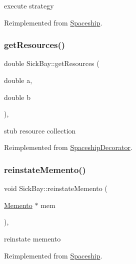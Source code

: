 execute strategy 

Reimplemented from \hyperlink{classSpaceship}{Spaceship}.

\mbox{\label{classSickBay_ab14fde02df1e95c352ba51d59480c3fa}} 
\subsubsection{\texorpdfstring{get\+Resources()}{getResources()}}
{\footnotesize\ttfamily double Sick\+Bay\+::get\+Resources (\begin{DoxyParamCaption}\item[{double}]{a,  }\item[{double}]{b }\end{DoxyParamCaption})\hspace{0.3cm}{\ttfamily [inline]}, {\ttfamily [virtual]}}

stub resource collection 

Reimplemented from \hyperlink{classSpaceshipDecorator_a5ee7a9a8c146c85f08591e47d971dce7}{Spaceship\+Decorator}.

\mbox{\label{classSickBay_a1b2156dee5ed14c68c3f25ee3a53e9c8}} 
\subsubsection{\texorpdfstring{reinstate\+Memento()}{reinstateMemento()}}
{\footnotesize\ttfamily void Sick\+Bay\+::reinstate\+Memento (\begin{DoxyParamCaption}\item[{\hyperlink{classMemento}{Memento} $\ast$}]{mem }\end{DoxyParamCaption})\hspace{0.3cm}{\ttfamily [inline]}, {\ttfamily [virtual]}}

reinstate memento 

Reimplemented from \hyperlink{classSpaceship_ab075c869473344b6471c8e28ca7ea61e}{Spaceship}.

\mbox{\label{classSickBay_ac25920ac3e757e289ea25233991fa94e}} 
